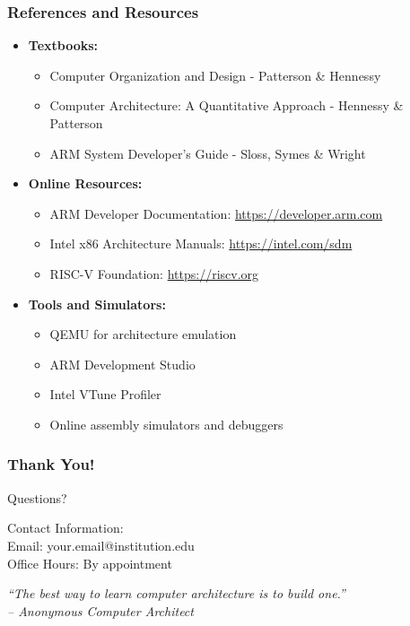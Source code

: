 \documentclass[aspectratio=169,xcolor=dvipsnames]{beamer}
\begin{document}
\begin{frame}
    \frametitle{References and Resources}
    \begin{itemize}
        \item \textbf{Textbooks:}
        \begin{itemize}
            \item Computer Organization and Design - Patterson \& Hennessy
            \item Computer Architecture: A Quantitative Approach - Hennessy \& Patterson
            \item ARM System Developer's Guide - Sloss, Symes \& Wright
        \end{itemize}
        \item \textbf{Online Resources:}
        \begin{itemize}
            \item ARM Developer Documentation: \url{https://developer.arm.com}
            \item Intel x86 Architecture Manuals: \url{https://intel.com/sdm}
            \item RISC-V Foundation: \url{https://riscv.org}
        \end{itemize}
        \item \textbf{Tools and Simulators:}
        \begin{itemize}
            \item QEMU for architecture emulation
            \item ARM Development Studio
            \item Intel VTune Profiler
            \item Online assembly simulators and debuggers
        \end{itemize}
    \end{itemize}
\end{frame}

\begin{frame}
    \frametitle{Thank You!}
    \begin{center}
        \Huge Questions?
        
        \vspace{1cm}
        
        \large
        Contact Information:\\
        Email: your.email@institution.edu\\
        Office Hours: By appointment
        
        \vspace{1cm}
        
        \normalsize
        \textit{``The best way to learn computer architecture is to build one.''}\\
        \textit{-- Anonymous Computer Architect}
    \end{center}
\end{frame}
\end{document}
